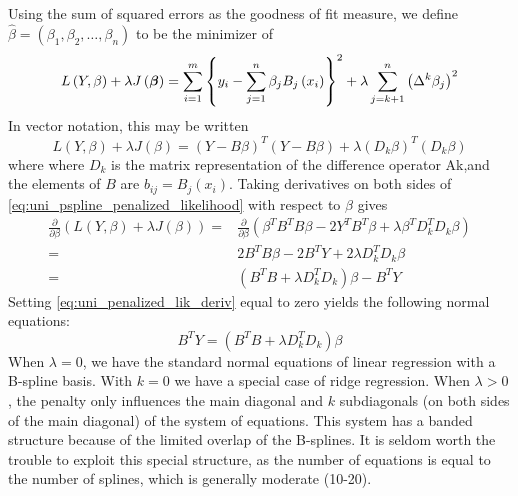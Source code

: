 \documentclass[12pt]{article}
\newcommand{\bfbeta}{\mbox{\boldmath $\beta$}}
\begin{document}
Using the sum of squared errors as the goodness of fit measure, we define $\hat{\beta} = \left(\beta_1, \beta_2, \dots, \beta_n \right)$ to be the minimizer of
\begin{equation*}  
L\left(Y, \beta \right) + \lambda J\left(\bfbeta\right) = \sum_{i=1}^m \left\{ y_i - \sum_{j=1}^n \beta_j B_j\left(x_i\right) \right\}^2 + \lambda \sum_{j=k+1}^n \left( \Delta^k\beta_j \right)^2
\end{equation*}
\noindent
In vector notation, this may be written
\begin{equation}\label{eq:uni_pspline_penalized_likelihood}
L\left(Y, \beta \right) + \lambda J\left(\beta\right) = \left( Y- B\beta  \right)^T \left( Y-B \beta\right) + \lambda \left(D_k \beta\right)^T\left(D_k \beta\right)
\end{equation}
\noindent
where where $D_k$ is the matrix representation of the difference operator Ak,and the elements of $B$ are $b_{ij} = B_j\left(x_i\right)$. Taking derivatives on both sides of \ref{eq:uni_pspline_penalized_likelihood} with respect to $\beta$ gives
\begin{align}
\frac{\partial}{\partial \beta}\left(L\left(Y, \beta \right) + \lambda J\left(\beta\right) \right) ={} & \frac{\partial}{\partial \beta}\left(\beta^TB^TB \beta -2Y^T B^T\beta+\lambda \beta^T D_k^T D_k \beta  \right) \nonumber \\
= {} & 2B^TB \beta - 2B^T Y + 2\lambda D_k^TD_k\beta \nonumber\\
= {} & \left(B^T B +  \lambda D_k^TD_k\right)\beta - B^T Y \label{eq:uni_penalized_lik_deriv}
\end{align} 
\noindent
Setting \ref{eq:uni_penalized_lik_deriv} equal to zero yields the following normal equations:
\begin{equation}\label{eq:uni_pspline_normal_eq}
B^T Y = \left(B^T B +  \lambda D_k^TD_k\right)\beta
\end{equation}
When $\lambda = 0$, we have the standard normal equations of linear regression with a B-spline basis. With $k = 0$ we have a special case of ridge regression. When $\lambda > 0$, the penalty only influences the main diagonal and $k$ subdiagonals (on both sides of the main diagonal) of the system of equations. This system has a banded structure because of the limited overlap of the B-splines. It is seldom worth the trouble to exploit this special structure, as the number of equations is equal to the number of splines, which is generally moderate (10-20). 
\end{document}
